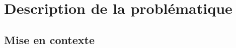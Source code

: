 \chapter{Description de la problématique}\label{chap:description}
\section{Mise en contexte}


% 

% 

% 

% 

